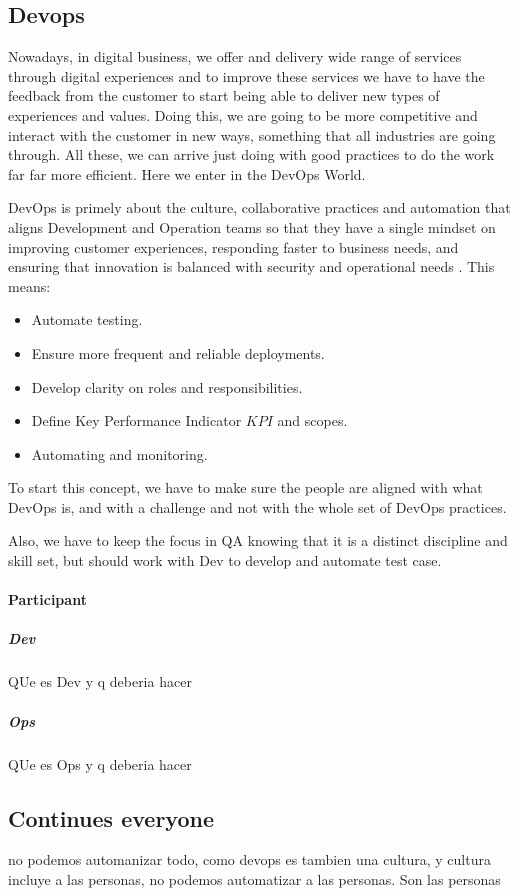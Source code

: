 \subsection{Devops}
Nowadays, in digital business, we offer and delivery wide range of services through digital experiences and to improve these services we have to have the feedback from the customer to start being able to deliver new types of experiences and values. Doing this, we are going to be more competitive and interact with the customer in new ways, something that all industries are going through.
All these, we can arrive just doing with good practices to do the work far far more efficient. Here we enter in the DevOps World.

DevOps is primely  about the culture, collaborative practices and automation that aligns Development and Operation teams so that they have a single mindset on improving customer experiences, responding faster to business needs, and ensuring that innovation is balanced with security and operational needs \cite{IsaacSacolick2016DrivingCulture}. This means:

\begin{itemize}
\item Automate testing.
\item Ensure more frequent and reliable deployments.
\item Develop clarity on roles and responsibilities.
\item Define Key Performance Indicator \(KPI\) and scopes.
\item Automating and monitoring.
\end{itemize}

To start this concept, we have to make sure the people are aligned with what DevOps is, and with a challenge and not with the whole set of DevOps practices.

Also, we have to keep the focus in QA knowing that it is a distinct discipline and skill set, but should work with Dev to develop and automate test case.

\paragraph{Participant}
\subparagraph{Dev}
QUe es Dev y q deberia hacer

\subparagraph{Ops}
QUe es Ops y q deberia hacer

\subsection{Continues everyone}
no podemos automanizar todo, como devops es tambien una cultura, y cultura incluye a las personas, no podemos automatizar a las personas.
Son las personas

